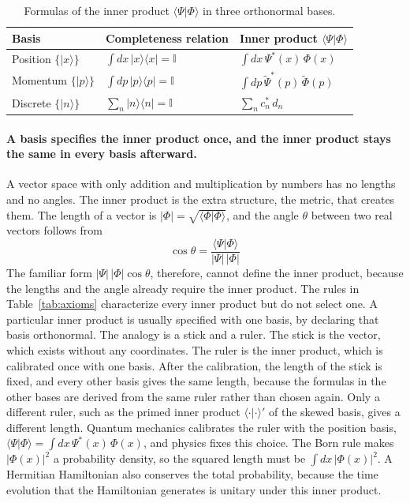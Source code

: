 \documentclass[11pt]{article}      %
\numberwithin{equation}{section}   %
\begin{document}
\begin{table}[h]
    \centering
    \caption{Formulas of the inner product $\langle \Psi | \Phi \rangle$ in three orthonormal bases.}
    \label{tab:inner}
    \renewcommand{\arraystretch}{1.5}
    \begin{tabular}{lll}
        \toprule
        Basis & Completeness relation & Inner product $\langle \Psi | \Phi \rangle$ \\
        \midrule
        Position $\{|x\rangle\}$ & $\int dx\, |x\rangle\langle x| = \mathbb{I}$ & $\int dx\, \Psi^{*}(x)\, \Phi(x)$ \\
        Momentum $\{|p\rangle\}$ & $\int dp\, |p\rangle\langle p| = \mathbb{I}$ & $\int dp\, \tilde{\Psi}^{*}(p)\, \tilde{\Phi}(p)$ \\
        Discrete $\{|n\rangle\}$ & $\sum_n |n\rangle\langle n| = \mathbb{I}$ & $\sum_n c_n^{*}\, d_n$ \\
        \bottomrule
    \end{tabular}
\end{table}

\paragraph{A basis specifies the inner product once, and the inner product stays the same in every basis afterward.} A vector space with only addition and multiplication by numbers has no lengths and no angles. The inner product is the extra structure, the metric, that creates them. The length of a vector is $|\Phi| = \sqrt{\langle \Phi | \Phi \rangle}$, and the angle $\theta$ between two real vectors follows from
\begin{equation*}
    \cos\theta = \frac{\langle \Psi | \Phi \rangle}{|\Psi|\, |\Phi|}
\end{equation*}
The familiar form $|\Psi|\, |\Phi| \cos\theta$, therefore, cannot define the inner product, because the lengths and the angle already require the inner product. The rules in Table~\ref{tab:axioms} characterize every inner product but do not select one. A particular inner product is usually specified with one basis, by declaring that basis orthonormal. The analogy is a stick and a ruler. The stick is the vector, which exists without any coordinates. The ruler is the inner product, which is calibrated once with one basis. After the calibration, the length of the stick is fixed, and every other basis gives the same length, because the formulas in the other bases are derived from the same ruler rather than chosen again. Only a different ruler, such as the primed inner product $\langle \cdot | \cdot \rangle'$ of the skewed basis, gives a different length. Quantum mechanics calibrates the ruler with the position basis, $\langle \Psi | \Phi \rangle = \int dx\, \Psi^{*}(x)\, \Phi(x)$, and physics fixes this choice. The Born rule makes $|\Phi(x)|^2$ a probability density, so the squared length must be $\int dx\, |\Phi(x)|^2$. A Hermitian Hamiltonian also conserves the total probability, because the time evolution that the Hamiltonian generates is unitary under this inner product.
\end{document}
